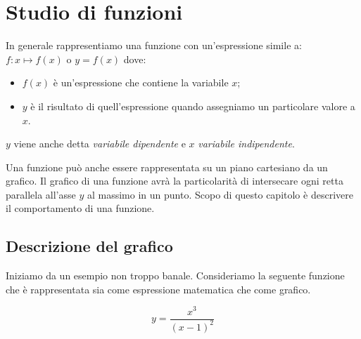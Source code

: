 


% 

% 

\chapter{Studio di funzioni}

In generale rappresentiamo una funzione con un'espressione simile 
a:~\(f: x \mapsto f(x)\) o \(y = f(x)\) dove:
\begin{itemize} [nosep]
 \item \(f(x)\) è un'espressione che contiene la variabile \(x\);
 \item \(y\) è il risultato di quell'espressione quando assegniamo un 
particolare valore a \(x\). 
\end{itemize}

\vspace{-.5em}
\begin{center}
\textbf{\(y\)} viene anche detta \emph{variabile dipendente} e 
\textbf{\(x\)} \emph{variabile indipendente}.
\end{center}
\vspace{-.5em}

Una funzione può anche essere rappresentata su un piano cartesiano da un 
grafico. 
Il grafico di una funzione avrà la particolarità di intersecare ogni retta 
parallela all'asse \(y\) al massimo in un punto.
Scopo di questo capitolo è descrivere il comportamento di una funzione.

\section{Descrizione del grafico}
\label{sec:descrizione_grafico}
Iniziamo da un esempio non troppo banale. 
Consideriamo la seguente funzione che è rappresentata sia come espressione 
matematica che come grafico.

\begin{minipage}{.20\linewidth}
\[y=\frac{x^3}{(x-1)^2}\]
\end{minipage}
\hfill
\begin{minipage}{.78\linewidth}
 \begin{center}
 \scalebox{.8}{\funzionea}
 \end{center}
\end{minipage}
\vspace{.5em}

